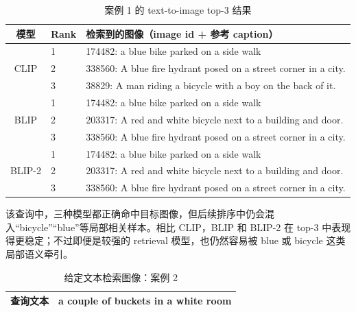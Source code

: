 \documentclass[UTF8,a4paper,10pt]{ctexart}
\begin{document}
\begin{table}[H]
    \centering
    \caption{案例 1 的 text-to-image top-3 结果}
    \begin{tabular}{clp{8.5cm}}
        \toprule
        模型 & Rank & 检索到的图像（image id + 参考 caption） \\
        \midrule
        \multirow{3}{*}{CLIP}
        & 1 & 174482: a blue bike parked on a side walk \\
        & 2 & 338560: A blue fire hydrant posed on a street corner in a city. \\
        & 3 & 38829: A man riding a bicycle with a boy on the back of it. \\
        \midrule
        \multirow{3}{*}{BLIP}
        & 1 & 174482: a blue bike parked on a side walk \\
        & 2 & 203317: A red and white bicycle next to a building and door. \\
        & 3 & 338560: A blue fire hydrant posed on a street corner in a city. \\
        \midrule
        \multirow{3}{*}{BLIP-2}
        & 1 & 174482: a blue bike parked on a side walk \\
        & 2 & 203317: A red and white bicycle next to a building and door. \\
        & 3 & 338560: A blue fire hydrant posed on a street corner in a city. \\
        \bottomrule
    \end{tabular}
\end{table}

该查询中，三种模型都正确命中目标图像，但后续排序中仍会混入“bicycle”“blue”等局部相关样本。相比 CLIP，BLIP 和 BLIP-2 在 top-3 中表现得更稳定；不过即便是较强的 retrieval 模型，也仍然容易被 blue 或 bicycle 这类局部语义牵引。

\begin{table}[H]
    \centering
    \caption{给定文本检索图像：案例 2}
    \begin{tabular}{p{3cm}p{11cm}}
        \toprule
        查询文本 & a couple of buckets in a white room \\
        \bottomrule
    \end{tabular}
\end{table}
\end{document}
